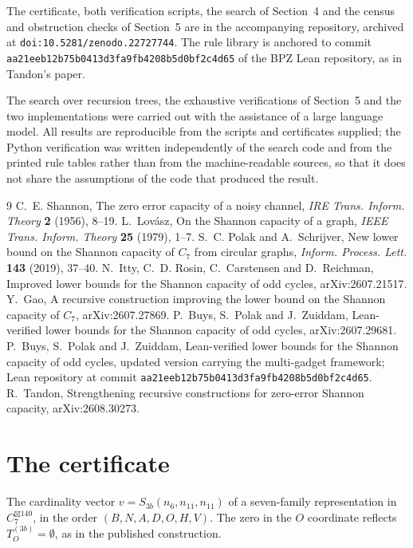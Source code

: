 \documentclass[11pt]{article}
\theoremstyle{definition}
\begin{document}
The certificate, both verification scripts, the search of Section~4 and the census and
obstruction checks of Section~5 are in the accompanying repository, archived at
\texttt{doi:10.5281/zenodo.22727744}. The rule library is anchored
to commit
\texttt{aa21eeb12b75b041}\allowbreak\texttt{3d3fa9fb4208b5d0bf2c4d65} of the BPZ Lean repository, as in Tandon's
paper.

The search over recursion trees, the exhaustive verifications of Section~5 and the two
implementations were carried out with the assistance of a large language model. All results are
reproducible from the scripts and certificates supplied; the Python verification was written
independently of the search code and from the printed rule tables rather than from the
machine-readable sources, so that it does not share the assumptions of the code that produced the
result.

\begin{thebibliography}{9}
 C.~E. Shannon, The zero error capacity of a noisy channel,
  \emph{IRE Trans. Inform. Theory} \textbf{2} (1956), 8--19.
 L.~Lov\'asz, On the Shannon capacity of a graph,
  \emph{IEEE Trans. Inform. Theory} \textbf{25} (1979), 1--7.
 S.~C. Polak and A.~Schrijver, New lower bound on the Shannon capacity of $C_7$ from
  circular graphs, \emph{Inform. Process. Lett.} \textbf{143} (2019), 37--40.
 N.~Itty, C.~D. Rosin, C.~Carstensen and D.~Reichman, Improved lower bounds for the
  Shannon capacity of odd cycles, arXiv:2607.21517.
 Y.~Gao, A recursive construction improving the lower bound on the Shannon capacity
  of $C_7$, arXiv:2607.27869.
 P.~Buys, S.~Polak and J.~Zuiddam, Lean-verified lower bounds for the Shannon
  capacity of odd cycles, arXiv:2607.29681.
 P.~Buys, S.~Polak and J.~Zuiddam, Lean-verified lower bounds for the Shannon
  capacity of odd cycles, updated version carrying the multi-gadget framework; Lean repository
  at commit \texttt{aa21eeb12b75b041}\allowbreak\texttt{3d3fa9fb4208b5d0bf2c4d65}.
 R.~Tandon, Strengthening recursive constructions for zero-error Shannon capacity,
  arXiv:2608.30273.
\end{thebibliography}

\appendix
\section{The certificate}

The cardinality vector $v = S_{3b}(n_6, n_{11}, n_{11})$ of a seven-family representation
in $C_7^{\boxtimes 140}$, in the order $(B,N,A,D,O,H,V)$. The zero in the $O$ coordinate
reflects $T^{(3b)}_O = \emptyset$, as in the published construction.
\end{document}

